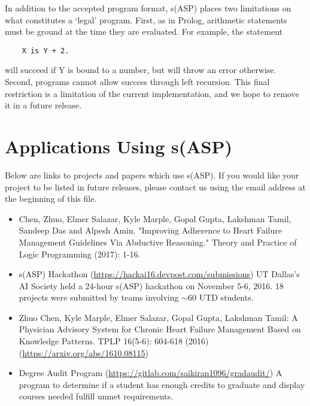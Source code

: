 \documentclass[]{article}
\begin{document}
In addition to the accepted program format, s(ASP) places two limitations on
what constitutes a `legal' program. First, as in Prolog, arithmetic statements
must be ground at the time they are evaluated. For example, the statement
\begin{verbatim}
    X is Y + 2.
\end{verbatim}
will succeed if Y is bound to a number, but will throw an error otherwise.
Second, programs cannot allow success through left recursion. This
final restriction is a limitation of the current implementation, and we hope to
remove it in a future release.


\section{Applications Using s(ASP)}

Below are links to projects and papers which use s(ASP). If you would like your
project to be listed in future releases, please contact us using the email
address at the beginning of this file.

\begin{itemize}
\item Chen, Zhuo, Elmer Salazar, Kyle Marple, Gopal Gupta, Lakshman Tamil, Sandeep Das and Alpesh Amin. "Improving Adherence to Heart Failure Management Guidelines Via Abductive Reasoning." Theory and Practice of Logic Programming (2017): 1-16.
\item s(ASP) Hackathon (\url{https://hackai16.devpost.com/submissions}) UT
Dallas's AI Society held a 24-hour s(ASP) hackathon on November 5-6, 2016. 18
projects were submitted by teams involving $\sim$60 UTD students.
\item  Zhuo Chen, Kyle Marple, Elmer Salazar, Gopal Gupta, Lakshman Tamil: A 
Physician Advisory System for Chronic Heart Failure Management Based on 
Knowledge Patterns. TPLP 16(5-6): 604-618 (2016) 
(\url{https://arxiv.org/abs/1610.08115})
\item Degree Audit Program (\url{https://gitlab.com/saikiran1096/gradaudit/}) 
A program to determine if a student has enough credits to graduate and display 
courses needed fulfill unmet requirements.
\end{itemize}
\end{document}
